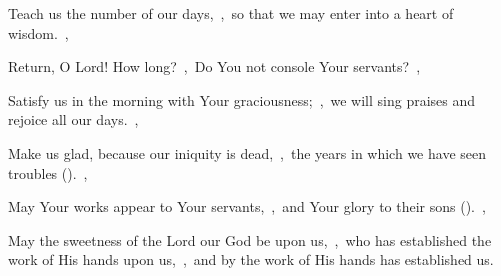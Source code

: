 \documentclass[12pt,twoside,a5paper]{article}
\begin{document}
\begin{normalparskip}
  Teach us the number of our days,~\sep\ so that we may enter into a heart of wisdom.~\sep

  Return, O Lord! How long?~\sep\ Do You not console Your servants?~\sep

  Satisfy us in the morning with Your graciousness;~\sep\ we will sing praises and rejoice all our days.~\sep

  Make us glad, because our iniquity is dead,~\sep\ the years in which we have seen troubles ().~\sep

  May Your works appear to Your servants,~\sep\ and Your glory to their sons ().~\sep

  May the sweetness of the Lord our God be upon us,~\sep\ who has established the work of His hands upon us,~\sep\ and by the work of His hands has established us.
\end{normalparskip}

\end{document}
